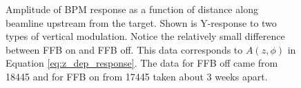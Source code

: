 \begin{figure}[ht]
\centering
{}
\caption{Amplitude of BPM response as a function of distance along beamline upstream from the target. Shown is Y-response to two types of vertical modulation. Notice the relatively small difference between FFB on and FFB off.  This data corresponds to $A(z,\phi)$ in Equation \ref{eq:z_dep_response}. The data for FFB off came from 18445 and for FFB on from 17445 taken about 3 weeks apart.}
\label{fig:bpm_amplitude_vs_z_ymod}
\end{figure}

